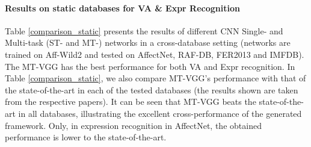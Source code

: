\documentclass{bmvc2k}
\begin{document}
\paragraph{Results on static databases for VA \& Expr Recognition}
Table \ref{comparison_static} presents the results of different CNN Single- and Multi-task (ST- and MT-) networks in a cross-database setting (networks are trained on Aff-Wild2 and tested on AffectNet, RAF-DB, FER2013 and IMFDB). The MT-VGG has the best performance for both VA and Expr recognition. In Table \ref{comparison_static}, we also compare MT-VGG's performance with that of the state-of-the-art in each of the tested databases (the results shown are taken from the respective papers). It can be seen that MT-VGG beats the state-of-the-art in all databases, illustrating the excellent cross-performance of the generated framework.  Only, in expression recognition in AffectNet, the obtained performance is lower to the state-of-the-art. 
\end{document}
